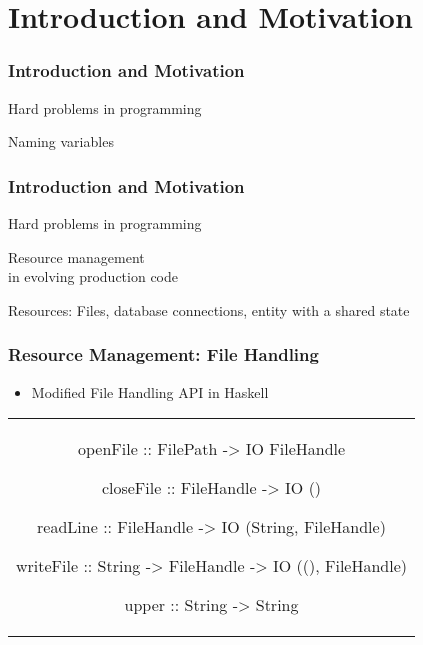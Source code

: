 \section{Introduction and Motivation}\label{sec:introduction}

\begin{frame}[c]
  \frametitle{Introduction and Motivation}
  {\large
    \begin{center}
      Hard problems in programming

      {\color{red}Naming variables}
    \end{center}
    }
\end{frame}

\begin{frame}
  \frametitle{Introduction and Motivation}
  \begin{large}
  \begin{center}
    Hard problems in programming

    {\color{red}Resource management}
    \\{\normalsize  in evolving production code}

    {\normalsize Resources: Files, database connections, entity with a shared state}
\end{center}
\end{large}
\end{frame}

\begin{frame}[fragile, c]
  \frametitle{Resource Management: File Handling}
  \begin{center}
    \begin{itemize}
    \item Modified File Handling API in Haskell
    \end{itemize}
    \begin{tabular}[h]{c}
      \begin{haskell}
     openFile  :: FilePath   -> IO FileHandle

     closeFile :: FileHandle -> IO ()

     readLine  :: FileHandle -> IO (String, FileHandle)

     writeFile :: String     -> FileHandle
                             -> IO ((), FileHandle)


     upper     :: String     -> String
      \end{haskell}
    \end{tabular}
\end{center}
\end{frame}

